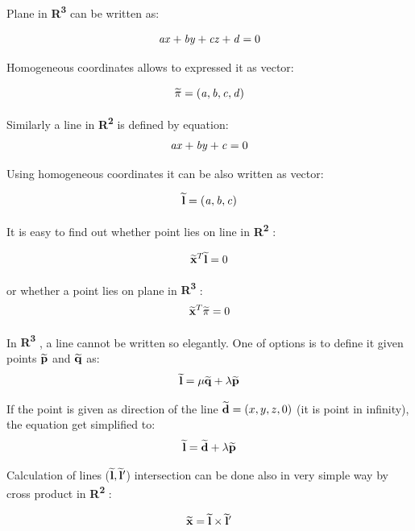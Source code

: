 \documentclass[a4paper,12pt]{article}
\newcommand{\ehvect}[1]{
{\bf \widetilde{#1}}
}
\newcommand{\escal}[1]{
{\it #1}
}
\newcommand{\eucl}[1]{
{\bf R\textsuperscript{#1}}
}
\begin{document}
Plane in \eucl{3} can be written as:

\begin{equation}
\escal{a}\escal{x} + \escal{b}\escal{y} + \escal{c}\escal{z} + \escal{d} = 0
\end{equation}

Homogeneous coordinates allows to expressed it as vector:

\begin{equation}
\ehvect{\pi} =  (\escal{a}, \escal{b}, \escal{c}, \escal{d})
\end{equation}


Similarly a line in \eucl{2} is defined by equation:
\begin{equation}
\escal{a}\escal{x} + \escal{b}\escal{y} + \escal{c} = 0
\end{equation}

Using homogeneous coordinates it can be also written as vector:

\begin{equation}
\ehvect{l} =  (\escal{a}, \escal{b}, \escal{c})
\end{equation}

It is easy to find out whether point lies on line in \eucl{2}:

\begin{equation}
\ehvect{x}^{T} \ehvect{l} = 0
\end{equation}

or whether a point lies on plane in \eucl{3}:
\begin{equation}
\ehvect{x}^{T} \ehvect{\pi} = 0
\end{equation}


In \eucl{3}, a line cannot be written so elegantly.
One of options is to define it given points $\ehvect{p}$ and $\ehvect{q}$ as:
\begin{equation}
 \ehvect{l} = \escal{\mu}\ehvect{q} + \escal{\lambda}\ehvect{p}
\end{equation}

If the point is given as direction of the line $\ehvect{d} = (x, y, z, 0)$ (it is point in infinity), the equation get simplified to:
\begin{equation}
\label{eq:hline}
\ehvect{l} = \ehvect{d} + \escal{\lambda}\ehvect{p}
\end{equation}

Calculation of  lines ($\ehvect{l}, \ehvect{l}'$) intersection  can be done also in very simple way by cross product in \eucl{2}:

\begin{equation}
\ehvect{x} = \ehvect{l} \times \ehvect{l}' \label{eq:def_hline_pts}
\end{equation}
\end{document}
